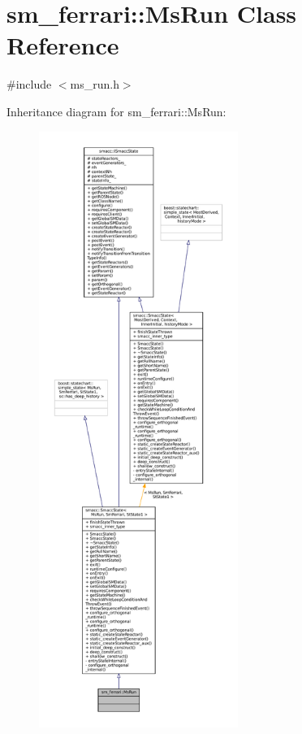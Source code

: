 \hypertarget{classsm__ferrari_1_1MsRun}{}\section{sm\+\_\+ferrari\+:\+:Ms\+Run Class Reference}
\label{classsm__ferrari_1_1MsRun}


{\ttfamily \#include $<$ms\+\_\+run.\+h$>$}



Inheritance diagram for sm\+\_\+ferrari\+:\+:Ms\+Run\+:
\nopagebreak
\begin{figure}[H]
\begin{center}
\leavevmode
\includegraphics[height=550pt]{classsm__ferrari_1_1MsRun__inherit__graph}
\end{center}
\end{figure}


